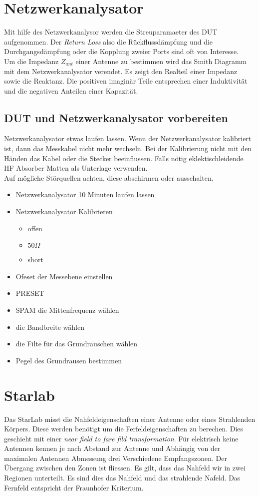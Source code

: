 	\section{ Netzwerkanalysator }
	Mit hilfe des Netzwerkanalysor werden die Streuparamaeter des DUT aufgenommen. Der \textit{Return Loss} also  die Rückflussdämpfung und die Durchgangsdämpfung oder die Kopplung zweier Ports sind oft von Interesse.\\
	Um die Impedanz $Z_{ant}$ einer Antenne zu bestimmen wird das Smith Diagramm mit dem Netzwerkanalysator verendet. Es zeigt den Realteil einer Impedanz sowie die Reaktanz. Die positiven imaginär Teile entsprechen einer Induktivität  und die negativen Anteilen einer Kapazität.
	
	\subsection{DUT und Netzwerkanalysator vorbereiten}
	Netzwerkanalysator etwas laufen lassen. Wenn der Netzwerkanalysator kalibriert ist, dann das Messkabel nicht mehr wechseln. Bei der Kalibrierung nicht mit den Händen das Kabel oder die Stecker beeinflussen. Falls nötig eklektischleidende HF Absorber Matten als Unterlage verwenden. \\
	Auf mögliche Störquellen achten, diese abschirmen oder ausschalten.
	\begin{itemize}
	\item Netzwerkanalysator 10 Minuten laufen lassen
	\item Netzwerkanalysator Kalibrieren
	\begin{itemize}
	\item offen
	\item $50\Omega$
	\item short
	\end{itemize}
	\item Ofeset der Messebene einstellen
	\item PRESET
	\item SPAM die Mittenfrequenz wählen
	\item die Bandbreite wählen
	\item die Filte für das Grundrauschen wählen
	\item Pegel des Grundrausen bestimmen
	\end{itemize}
	
	\section{Starlab}
	Das StarLab misst die Nahfeldeigenschaften einer Antenne oder eines Strahlenden Körpers. Diese werden benötigt um die Ferfeldeigenschaften zu berechen. Dies geschieht mit einer \textit{near field to fare fild transformation}. Für elektrisch keine Antennen kennen je nach Abstand zur Antenne und Abhängig von der maximalen Antennen Abmessung drei Verschiedene Empfangszonen. Der Übergang zwischen den Zonen ist fliessen. Es gilt, dass das Nahfeld wir in zwei Regionen unterteilt. Es sind dies das Nahfeld und das strahlende Nafeld. Das Fernfeld entspricht der Fraunhofer Kriterium.
	
